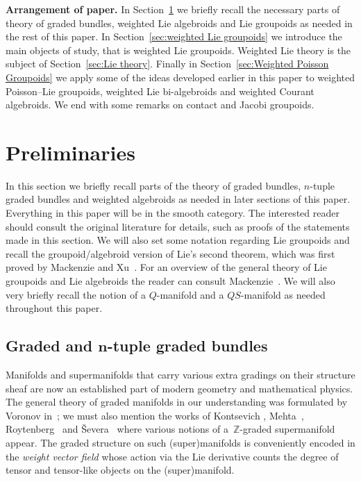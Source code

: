 \documentclass[pdftex]{sigma}
\numberwithin{equation}{section}
\begin{document}
\textbf{Arrangement of paper.} In Section~\ref{sec:Preliminaries} we brief\/ly recall the necessary parts of theory of graded bundles, weighted Lie algebroids and Lie groupoids as needed in the rest of this paper.  In Section~\ref{sec:weighted Lie groupoids} we introduce the main objects of study, that is weighted Lie groupoids. Weighted Lie theory is the subject of Section~\ref{sec:Lie theory}. Finally in Section~\ref{sec:Weighted Poisson Groupoids} we apply some of the ideas developed earlier in this paper to weighted Poisson--Lie groupoids, weighted Lie bi-algebroids and weighted Courant algebroids.  We end  with some remarks on contact and Jacobi groupoids.

\section{Preliminaries}\label{sec:Preliminaries}

In this section we brief\/ly recall parts of the theory of graded bundles, $n$-tuple graded bundles and weighted algebroids as needed in later sections of this paper. Everything in this paper will be in the smooth category.  The interested reader should consult the original literature \cite{Bruce:2014,Grabowski2013,Grabowski:2006,Grabowski2012} for details, such as proofs of the statements made in this section.  We will also set some notation regarding Lie groupoids and  recall  the groupoid/algebroid version of Lie's second theorem, which was f\/irst proved by Mackenzie and Xu~\cite{Mackenzie:2000}. For an overview of the general theory of Lie groupoids and Lie algebroids the reader can consult Mackenzie~\cite{Mackenzie2005}. We will also very brief\/ly recall the notion of a $Q$-manifold and a $QS$-manifold as needed throughout this paper.

\subsection[Graded and $n$-tuple graded bundles]{Graded and $\boldsymbol{n}$-tuple graded bundles}

Manifolds and supermanifolds that carry various extra gradings on their structure sheaf are now an established part of modern geometry and mathematical physics. The general theory of graded manifolds in our understanding was formulated  by Voronov  in~\cite{Voronov:2001qf};  we must also mention the  works of Kontsevich \cite{Kontsevich:2003}, Mehta~\cite{Mehta:2006}, Roytenberg~\cite{Roytenberg:2001} and \v{S}evera~\cite{Severa:2005} where various notions of a~$\mathbb{Z}$-graded supermanifold appear. The graded structure on such (super)manifolds is conveniently encoded in the \emph{weight vector field} whose action via the Lie derivative counts the degree of tensor and tensor-like objects on the (super)manifold.
\end{document}
